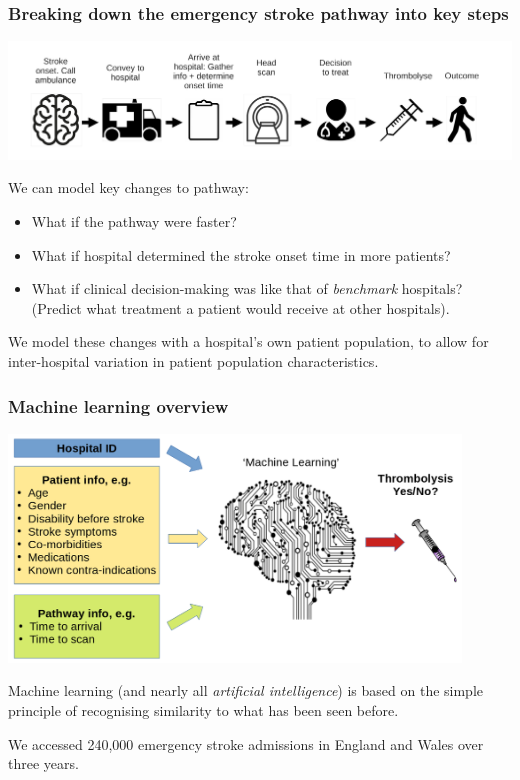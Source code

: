 \documentclass{beamer}
\begin{document}

\begin{frame}
\frametitle{Breaking down the emergency stroke pathway into key steps}
\begin{center}
\includegraphics[width=1.0\textwidth]{./images/pathway}
\end{center}
We can model key changes to pathway:
\begin{small}
\begin{itemize}
    \item What if the pathway were faster?
    \item What if hospital determined the stroke onset time in more patients?
    \item What if clinical decision-making was like that of \emph{benchmark} hospitals? (Predict what treatment a patient would receive at other hospitals).
\end{itemize}
\end{small}
\footnotesize{We model these changes with a hospital's own patient population, to allow for inter-hospital variation in patient population characteristics.}
\end{frame}


\begin{frame}
\frametitle{Machine learning overview}
\begin{center}
\includegraphics[width=0.90\textwidth]{./images/ml_model_high_level}
\end{center}


Machine learning (and nearly all \emph{artificial intelligence}) is based on the simple principle of recognising similarity to what has been seen before.
\vspace{3mm}

We accessed 240,000 emergency stroke admissions in England and Wales over three years.
\end{frame}
\end{document}
